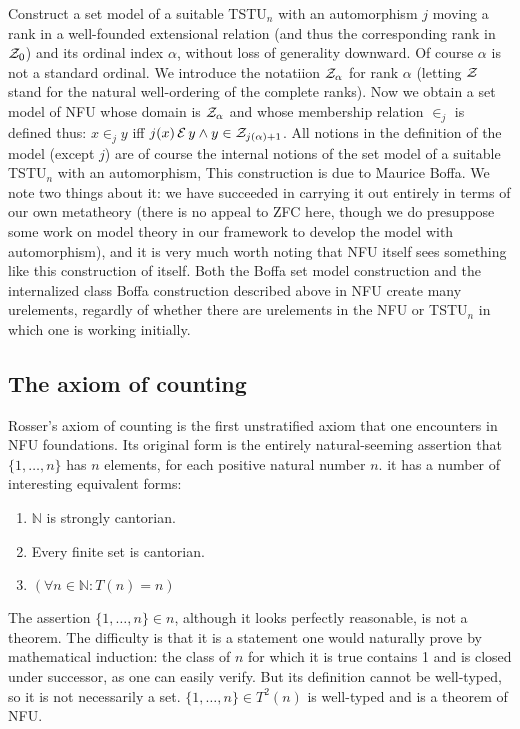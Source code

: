 \documentclass[12pt]{article}
\begin{document}
Construct a set model of a suitable TSTU$_n$ with an automorphism $j$  moving a rank in a well-founded extensional relation (and thus the corresponding rank in ${\cal Z}_0$) and its ordinal index $\alpha$, without loss of generality downward.  Of course $\alpha$ is not a standard ordinal.
We introduce the notatiion ${\cal Z}_{\alpha}$ for rank $\alpha$ (letting $\cal Z$ stand for the natural well-ordering of the complete ranks).  Now we obtain a set model of NFU whose domain is ${\cal Z}_{\alpha}$ and whose membership relation
$\in_j$ is defined thus: $x \in_j y$ iff $j(x)\, {\cal E}\, y \wedge y \in {\cal Z}_{j(\alpha)+1}$.  All notions in the definition of the model (except $j$) are of course the internal notions of the set model of a suitable TSTU$_n$ with an automorphism,
This construction is due to Maurice Boffa.  We note two things about it:  we have succeeded in carrying it out entirely in terms of our own metatheory (there is no appeal to ZFC here, though we do presuppose some work on model theory in our framework to develop the model with automorphism), and it is very much worth noting that NFU itself sees something like this construction of itself.  Both the Boffa set model construction and the internalized class Boffa construction described above in NFU create many urelements, regardly of whether there are urelements in the NFU or TSTU$_n$ in which one is working initially.

\subsection{The axiom of counting}

Rosser's axiom of counting is the first unstratified axiom that one encounters in NFU foundations.  Its original form is the entirely natural-seeming assertion that $\{1,\ldots,n\}$ has $n$ elements, for each positive natural number $n$.
it has a number of interesting equivalent forms:

\begin{enumerate}

\item  $\mathbb N$ is strongly cantorian.

\item  Every finite set is cantorian.

\item $(\forall n \in {\mathbb N}:T(n) = n)$

\end{enumerate}

The assertion $\{1,\ldots,n\} \in n$, although it looks perfectly reasonable, is not a theorem.  The difficulty is that it is a statement one would naturally prove by mathematical induction:  the class of $n$ for which it is true contains 1
and is closed under successor, as one can easily verify.  But its definition cannot be well-typed, so it is not necessarily a set.  $\{1,\ldots,n\} \in T^2(n)$ is well-typed and is a theorem of NFU.
\end{document}
